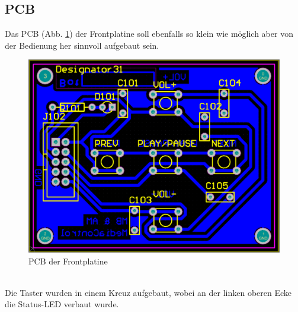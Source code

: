 \subsection{PCB}
Das PCB (Abb. \ref {fig:abb3.8}) der Frontplatine soll ebenfalls so klein wie möglich aber von der Bedienung her sinnvoll aufgebaut sein.
\begin{figure} [h]
	\centering
	\caption{PCB der Frontplatine}
	\label {fig:abb3.8}
	\includegraphics[width=1\textwidth]{schaltungen/front_pcb.png}
\end{figure} \\
Die Taster wurden in einem Kreuz aufgebaut, wobei an der linken oberen Ecke die Status-LED verbaut wurde.







